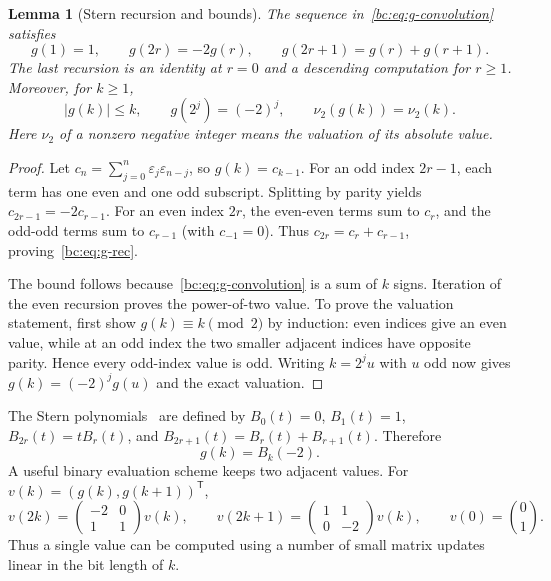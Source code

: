 \documentclass[11pt,a4paper,oneside,openany]{book}
\numberwithin{equation}{chapter}
\newtheorem{lemma}[theorem]{Lemma}
\theoremstyle{definition}
\theoremstyle{remark}
\newcommand{\eps}{\varepsilon}
\newcommand{\vnu}{\nu_2}
\begin{document}
\begin{lemma}[Stern recursion and bounds]
\label{bc:lem:stern}
The sequence in~\eqref{bc:eq:g-convolution} satisfies
\begin{equation}
 g(1)=1,\qquad g(2r)=-2g(r),\qquad
 g(2r+1)=g(r)+g(r+1).
 \label{bc:eq:g-rec}
\end{equation}
The last recursion is an identity at $r=0$ and a descending computation for
$r\ge1$. Moreover, for $k\ge1$,
\begin{equation}
 |g(k)|\le k,\qquad g(2^j)=(-2)^j,\qquad
 \vnu(g(k))=\vnu(k).
 \label{bc:eq:g-arithmetic}
\end{equation}
Here $\vnu$ of a nonzero negative integer means the valuation of its absolute value.
\end{lemma}
\begin{proof}
Let $c_n=\sum_{j=0}^n\eps_j\eps_{n-j}$, so $g(k)=c_{k-1}$.
For an odd index $2r-1$, each term has one even and one odd subscript. Splitting
by parity yields $c_{2r-1}=-2c_{r-1}$. For an even index $2r$, the even-even
terms sum to $c_r$, and the odd-odd terms sum to $c_{r-1}$ (with $c_{-1}=0$).
Thus $c_{2r}=c_r+c_{r-1}$, proving~\eqref{bc:eq:g-rec}.

The bound follows because~\eqref{bc:eq:g-convolution} is a sum of $k$ signs.
Iteration of the even recursion proves the power-of-two value. To prove the
valuation statement, first show $g(k)\equiv k\pmod2$ by induction: even indices
give an even value, while at an odd index the two smaller adjacent indices have
opposite parity. Hence every odd-index value is odd. Writing $k=2^ju$ with $u$
odd now gives $g(k)=(-2)^jg(u)$ and the exact valuation.
\end{proof}

The Stern polynomials~\cite{klavzar-stern} are defined by $B_0(t)=0$, $B_1(t)=1$,
$B_{2r}(t)=tB_r(t)$, and $B_{2r+1}(t)=B_r(t)+B_{r+1}(t)$. Therefore
\begin{equation}
 g(k)=B_k(-2).
 \label{bc:eq:Stern-identification}
\end{equation}
A useful binary evaluation scheme keeps two adjacent values. For
$v(k)=(g(k),g(k+1))^{\mathsf T}$,
\begin{equation}
 v(2k)=
 \begin{pmatrix}-2&0\\1&1\end{pmatrix}v(k),\qquad
 v(2k+1)=
 \begin{pmatrix}1&1\\0&-2\end{pmatrix}v(k),\qquad
 v(0)=\binom01.
 \label{bc:eq:binary-matrices}
\end{equation}
Thus a single value can be computed using a number of small matrix updates
linear in the bit length of $k$.
\end{document}
